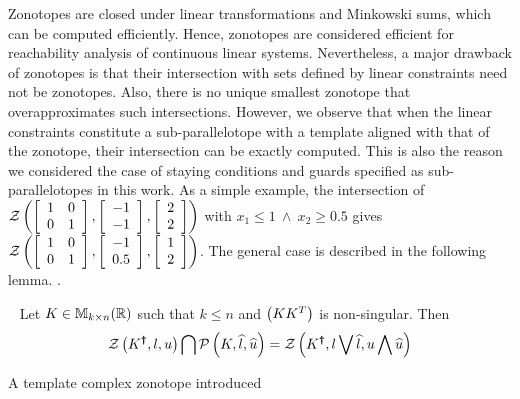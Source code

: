 Zonotopes are closed under linear transformations and Minkowski sums, which can be computed efficiently.  Hence, zonotopes are
considered efficient for reachability analysis of continuous linear systems.  Nevertheless,
a major drawback of zonotopes is that their intersection with sets defined by linear
constraints need not be zonotopes.  Also, there is no unique smallest
zonotope that overapproximates such intersections.  However, we observe that when the linear constraints
constitute a sub-parallelotope with a template aligned with that of
the zonotope, their intersection can be exactly computed.  This is
also the reason we considered the case of staying conditions and guards specified as sub-parallelotopes 
in this work. As a simple example, the intersection of
$\mathcal{Z}\left(\left[\begin{array}{l l}1 & 0 \\ 0 &
      1\end{array}\right],\left[\begin{array}{c}-1\\ -1\end{array}\right],\left[\begin{array}{c}2\\ 2\end{array}\right]\right)$
with $x_1\leq 1~\wedge~x_2\geq 0.5$ gives $\mathcal{Z}\left(\left[\begin{array}{l
        l}1 & 0 \\ 0 &
      1\end{array}\right],\left[\begin{array}{c}-1\\ 0.5\end{array}\right],\left[\begin{array}{c}1\\ 2\end{array}\right]\right)$.
The general case is described in the following lemma.%
.
%
\begin{lemma}~\label{lem:motivation}
Let $K\in\mathbb{M}_{k\times n}(\mathbb{R})$ such that $k\leq n$ and $\left(KK^T\right)$ is
non-singular.  Then
\[
\mathcal{Z}\left(K^{\bm{\dagger}},l,u\right) \bigcap \mathcal{P}\left(K,\widehat{l},\widehat{u}\right)
= \mathcal{Z}\left(K^{\bm{\dagger}},l\bigvee \widehat{l},u\bigwedge \widehat{u}\right)
\]
\end{lemma}
%
A template complex zonotope introduced
